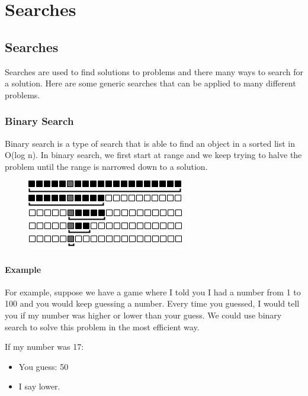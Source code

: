 \documentclass[11pt,oneside]{book}
\makeatletter
\def\maxwidth#1{\ifdim\Gin@nat@width>#1 #1\else\Gin@nat@width\fi}
\makeatother
\begin{document}
\part{ Searches }
    \chapter{ Searches }
        

Searches are used to find solutions to problems and there many ways to search for a solution. Here are some generic searches that can be applied to many different problems.


        \section{ Binary Search }
        

Binary search is a type of search that is able to find an object in a sorted list in O(log n). In binary search, we first start at range and we keep trying to halve the problem until the range is narrowed down to a solution.

\vspace{5px}\begin{figure}[H]\centering
        \includegraphics[width=0.66\maxwidth{\textwidth}]{binarysearch.png}
        \end{figure}

\subsection{Example}

For example, suppose we have a game where I told you I had a number from 1 to 100 and you would keep guessing a number. Every time you guessed, I would tell you if my number was higher or lower than your guess. We could use binary search to solve this problem in the most efficient way.

If my number was 17:

\begin{itemize}
\item You guess: 50
\item I say lower.
\end{itemize}
\end{document}
